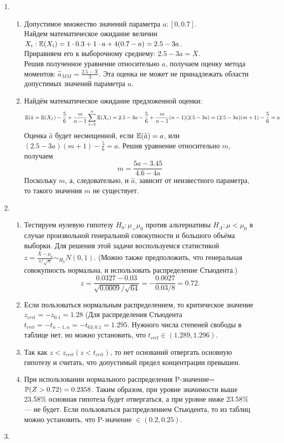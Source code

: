 \documentclass[pdftex,12pt,a4paper]{article}
\begin{document}
\begin{enumerate}
\begin{enumerate}
\end{enumerate}
\item \begin{enumerate}
\item Допустимое множество значений параметра $a: [0,0.7]$.\\
Найдем математическое ожидание величин $X_i: \E(X_i)=1\cdot 0.3+1\cdot a+4(0.7-a)=2.5-3a$.\\
Приравняем его к выборочному среднему: $2.5-3a=\bar{X}$.\\
Решив полученное уравнение относительно $a$, получаем оценку метода моментов:
$\hat{a}_{MM}=\frac{2.5-\bar{X}}{3}$. Эта оценка не может не принадлежать области допустимых значений параметра $a$.
\item Найдём математическое ожидание предложенной оценки:
\begin{equation}
\E(\hat{a}=\E(X_1)-\frac{5}{6}+\frac{m}{n-1}\sum_{i=2}^n \E(X_i)=2.5-3a-\frac{5}{6}+\frac{m}{n-1}(n-1)(2.5-3a)=(2.5-3a)(m+1)-\frac{5}{6}=a
\end{equation}
Оценка $\hat{a}$ будет несмещенной, если $\E(\hat{a})=a$, или $(2.5-3a)(m+1)-\frac{5}{6}=a$. Решив уравнение относительно $m$, получаем 
\begin{equation}
m=\frac{5a-3.45}{4.6-4a}
\end{equation}
Поскольку $m$, а, следовательно, и $\hat{a}$, зависит от неизвестного параметра, то такого значения $m$ не существует.
\end{enumerate}
\item \begin{enumerate}
\item Тестируем нулевую гипотезу $H_0: \mu_=\mu_0$ против альтернативы $H_A:\mu<\mu_0$ в случае произвольной генеральной совокупности и большого объёма выборки. Для решения этой задачи воспользуемся статистикой $z=\frac{\bar{X}-\mu_0}{s/\sqrt{n}}\sim_{H_0}N(0,1)$. (Можно также предположить, что генеральная совокупность нормальна, и использовать распределение Стьюдента.)\begin{equation}
z=\frac{0.0327-0.03}{\sqrt{0.0009}/\sqrt{64}}=-\frac{0.0027}{0.03/8}=0.72.
\end{equation}
\item Если пользоваться нормальным распределением, то критическое значение $z_{crit}=-z_{0.1}=1.28$ (Для распределения Стьюдента $t_{crit}=-t_{n-1,\alpha}=-t_{63,0.1}=1.295.$ Нужного числа степеней свободы в таблице нет, но можно установить, что $t_{crit} \in (1.289,1.296).$
\item Так как $z<z_{crit} (z<t_{crit})$, то нет оснований отвергать основную гипотезу и считать, что допустимый предел концентрации превышен.
\item При использовании нормального распределения P-значение=$\P(Z>0.72)=0.2358$. Таким образом, при уровне значимости выше 23.58\% основная гипотеза будет отвергаться, а при уровне ниже 23.58\% --- не будет. Если пользоваться распределением Стьюдента, то из таблиц можно установить, что P-значение $\in (0.2,0.25)$.
\end{enumerate}
\item \begin{enumerate}


\end{enumerate}
\end{enumerate}
\end{document}
